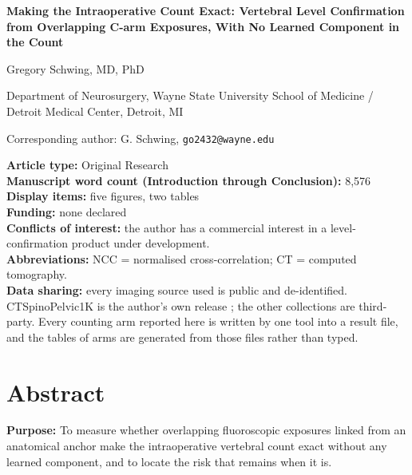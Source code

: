 \documentclass[11pt,letterpaper]{article}
\begin{document}
\begin{titlepage}
\begin{center}
{\Large\bfseries Making the Intraoperative Count Exact: Vertebral Level Confirmation from Overlapping
C-arm Exposures, With No Learned Component in the Count\par}
\vspace{1.2em}
{\normalsize Gregory Schwing, MD, PhD\par}
\vspace{0.4em}
{\small Department of Neurosurgery, Wayne State University School of Medicine / Detroit Medical Center,
Detroit, MI\par}
\vspace{0.6em}
{\small Corresponding author: G. Schwing, \texttt{go2432@wayne.edu}\par}
\end{center}

\vspace{1.5em}
\noindent\textbf{Article type:} Original Research\\[2pt]
\textbf{Manuscript word count (Introduction through Conclusion):} 8{,}576\\[2pt]
\textbf{Display items:} five figures, two tables\\[2pt]
\textbf{Funding:} none declared\\[2pt]
\textbf{Conflicts of interest:} the author has a commercial interest in a level-confirmation product under
development.\\[2pt]
\textbf{Abbreviations:} NCC = normalised cross-correlation; CT = computed tomography.\\[2pt]
\textbf{Data sharing:} every imaging source used is public and de-identified. CTSpinoPelvic1K is the
author's own release \citep{ctsp1k}; the other collections are third-party. Every counting arm reported
here is written by one tool into a result file, and the tables of arms are generated from those files
rather than typed.
\end{titlepage}

\section*{Abstract}

\noindent\textbf{Purpose:} To measure whether overlapping fluoroscopic exposures linked from an anatomical
anchor make the intraoperative vertebral count exact without any learned component, and to locate the risk
that remains when it is.
\end{document}
